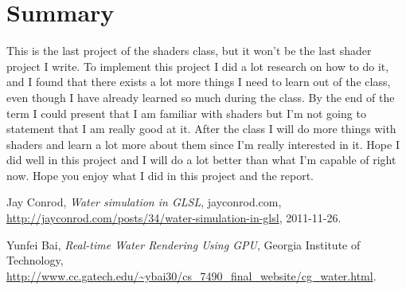 \documentclass[letterpaper,14pt,titlepage,fleqn]{article}
\begin{document}
\section{Summary}
This is the last project of the shaders class, but it won't be the last shader project I write. To implement this project I did a lot research on how to do it, and I found that there exists a lot more things I need to learn out of the class, even though I have already learned so much during the class. By the end of the term I could present that I am familiar with shaders but I'm not going to statement that I am really good at it. After the class I will do more things with shaders and learn a lot more about them since I'm really interested in it. Hope I did well in this project and I will do a lot better than what I'm capable of right now. Hope you enjoy what I did in this project and the report.

\begin{thebibliography}{9}
	Jay Conrod,
	\emph{Water simulation in GLSL},
	jayconrod.com,
	\url{http://jayconrod.com/posts/34/water-simulation-in-glsl},
	2011-11-26.
	
	Yunfei Bai,
	\emph{Real-time Water Rendering Using GPU},
	Georgia Institute of Technology,
	\url{http://www.cc.gatech.edu/~ybai30/cs_7490_final_website/cg_water.html}.
	
\end{thebibliography}
\end{document}
